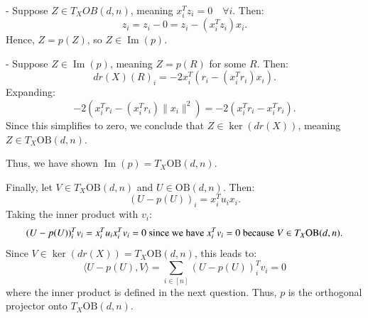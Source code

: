 \documentclass{article}
\begin{document}
- Suppose \( Z \in T_X OB(d, n) \), meaning \( x_i^T z_i = 0 \) $\text{ }\forall i$. Then:
  \[
  z_i = z_i - 0 = z_i - (x_i^T z_i) x_i.
  \]
  Hence, \( Z = p(Z) \), so \( Z \in \operatorname{Im}(p) \).

- Suppose \( Z \in \operatorname{Im}(p) \), meaning \( Z = p(R) \) for some \( R \). Then:
  \[
  dr(X)(R)_i = -2 x_i^T \left( r_i - (x_i^T r_i) x_i \right).
  \]
  Expanding:
  \[
  -2 \left( x_i^T r_i - (x_i^T r_i) \|x_i\|^2 \right) = -2 (x_i^T r_i - x_i^T r_i).
  \]
  Since this simplifies to zero, we conclude that \( Z \in \ker(dr(X)) \), meaning \( Z \in T_X \text{OB}(d, n) \). 

Thus, we have shown \( \operatorname{Im}(p) = T_X \text{OB}(d, n) \).

Finally, let \( V \in T_X \text{OB}(d, n) \) and \( U \in \text{OB}(d, n) \). Then:
\[
(U - p(U))_i = x_i^T u_i x_i.
\]
Taking the inner product with \( v_i \):
\[
(U - p(U))_i^T v_i = x_i^T u_i x_i^T v_i=0 \text{ since we have \( x_i^T v_i = 0 \) because \( V \in T_X \text{OB}(d, n) \)}.
\]
Since \( V \in \ker(dr(X)) = T_X \text{OB}(d, n) \), this leads to:
\[
\langle U-p(U),V\rangle=\sum_{i \in [n]} (U - p(U))_i^T v_i = 0
\]
where the inner product is defined in the next question. Thus, \( p \) is the orthogonal projector onto \( T_X \text{OB}(d, n) \).
\end{document}

